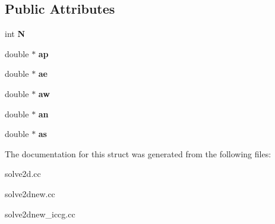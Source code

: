 \subsection*{Public Attributes}
\begin{DoxyCompactItemize}
\item 
\hypertarget{struct_five_diag_matrix_ae40f821c0cce86d57138dc4f7b93caf7}{}int {\bfseries N}\label{struct_five_diag_matrix_ae40f821c0cce86d57138dc4f7b93caf7}

\item 
\hypertarget{struct_five_diag_matrix_abccd7ab1fefbc80d477128fc2890acfd}{}double $\ast$ {\bfseries ap}\label{struct_five_diag_matrix_abccd7ab1fefbc80d477128fc2890acfd}

\item 
\hypertarget{struct_five_diag_matrix_a993ba972cb6074344de2012ff11a4081}{}double $\ast$ {\bfseries ae}\label{struct_five_diag_matrix_a993ba972cb6074344de2012ff11a4081}

\item 
\hypertarget{struct_five_diag_matrix_aa80cd22c5fc5f80036cb30a3cb33fd9d}{}double $\ast$ {\bfseries aw}\label{struct_five_diag_matrix_aa80cd22c5fc5f80036cb30a3cb33fd9d}

\item 
\hypertarget{struct_five_diag_matrix_a861162ba8d9b454756c33fd3c6f18ceb}{}double $\ast$ {\bfseries an}\label{struct_five_diag_matrix_a861162ba8d9b454756c33fd3c6f18ceb}

\item 
\hypertarget{struct_five_diag_matrix_a26566fac16068477c26dc80983bb5dd9}{}double $\ast$ {\bfseries as}\label{struct_five_diag_matrix_a26566fac16068477c26dc80983bb5dd9}

\end{DoxyCompactItemize}


The documentation for this struct was generated from the following files\+:\begin{DoxyCompactItemize}
\item 
solve2d.\+cc\item 
solve2dnew.\+cc\item 
solve2dnew\+\_\+iccg.\+cc\end{DoxyCompactItemize}

